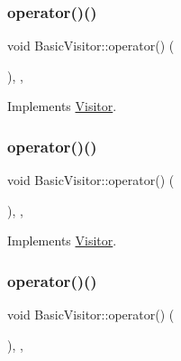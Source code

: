 \subsubsection{\texorpdfstring{operator()()}{operator()()}\hspace{0.1cm}{\footnotesize\ttfamily [29/60]}}
{\footnotesize\ttfamily void Basic\+Visitor\+::operator() (\begin{DoxyParamCaption}\item[{const \hyperlink{struct_do_while_statement}{Do\+While\+Statement} \&}]{ }\end{DoxyParamCaption})\hspace{0.3cm}{\ttfamily [inline]}, {\ttfamily [override]}, {\ttfamily [virtual]}}



Implements \hyperlink{struct_visitor_a077a0025430c4b35d310bdfcbe1b180a}{Visitor}.

\mbox{\label{struct_basic_visitor_a0a7f4e29df8d0725070caa8560d4c4b5}} 
\subsubsection{\texorpdfstring{operator()()}{operator()()}\hspace{0.1cm}{\footnotesize\ttfamily [30/60]}}
{\footnotesize\ttfamily void Basic\+Visitor\+::operator() (\begin{DoxyParamCaption}\item[{const \hyperlink{struct_while_statement}{While\+Statement} \&}]{ }\end{DoxyParamCaption})\hspace{0.3cm}{\ttfamily [inline]}, {\ttfamily [override]}, {\ttfamily [virtual]}}



Implements \hyperlink{struct_visitor_a4faef50c61a3c1246589390d925c2f53}{Visitor}.

\mbox{\label{struct_basic_visitor_a62043123e2fb7e0c22229b0e5bb7dcc8}} 
\subsubsection{\texorpdfstring{operator()()}{operator()()}\hspace{0.1cm}{\footnotesize\ttfamily [31/60]}}
{\footnotesize\ttfamily void Basic\+Visitor\+::operator() (\begin{DoxyParamCaption}\item[{const \hyperlink{struct_for_statement}{For\+Statement} \&}]{ }\end{DoxyParamCaption})\hspace{0.3cm}{\ttfamily [inline]}, {\ttfamily [override]}, {\ttfamily [virtual]}}



